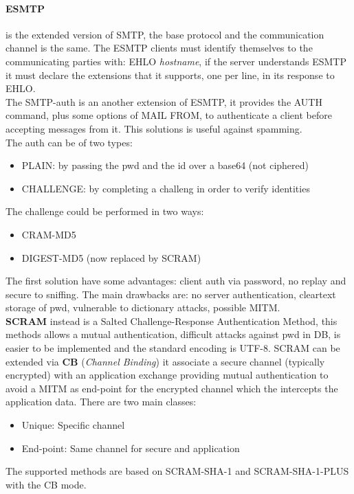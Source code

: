 \documentclass[12pt]{article}
\begin{document}
\paragraph{ESMTP} is the extended version of SMTP, the base protocol and the communication channel is the same. The ESMTP clients must identify themselves to the communicating parties with: EHLO \textit{hostname}, if the server understands ESMTP it must declare the extensions that it supports, one per line, in its response to EHLO.\\
The SMTP-auth is an another extension of ESMTP, it provides the AUTH command, plus some options of MAIL FROM, to authenticate a client before accepting messages from it. This solutions is useful against spamming.\\
The auth can be of two types:
\begin{itemize}
  \item PLAIN: by passing the pwd and the id over a base64 (not ciphered)
  \item CHALLENGE: by completing a challeng in order to verify identities
\end{itemize}
The challenge could be performed in two ways:
\begin{itemize}
  \item CRAM-MD5
  \item DIGEST-MD5 (now replaced by SCRAM)
\end{itemize}
The first solution have some advantages: client auth via password, no replay and secure to sniffing. The main drawbacks are: no server authentication, cleartext storage of pwd, vulnerable to dictionary attacks, possible MITM.\\
\textbf{SCRAM} instead is a Salted Challenge-Response Authentication Method, this methods allows a mutual authentication, difficult attacks against pwd in DB, is easier to be implemented and the standard encoding is UTF-8. SCRAM can be extended via \textbf{CB} (\textit{Channel Binding}) it associate a secure channel (typically encrypted) with an application exchange providing mutual authentication to avoid a MITM as end-point for the encrypted channel which the intercepts the application data. There are two main classes:
\begin{itemize}
  \item Unique: Specific channel
  \item End-point: Same channel for secure and application
\end{itemize}
The supported methods are based on SCRAM-SHA-1 and SCRAM-SHA-1-PLUS with the CB mode.
\end{document}
